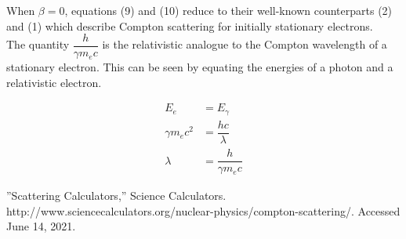 \documentclass{article}
\begin{document}
\noindent When $\beta = 0$, equations (9) and (10) reduce to their well-known counterparts (2) and (1) which describe Compton scattering for initially stationary electrons. \\

\noindent The quantity $\dfrac{h}{\gamma m_ec}$ is the relativistic analogue to the Compton wavelength of a stationary electron. This can be seen by equating the energies of a photon and a relativistic electron.

\begin{align*}
E_e &= E_\gamma \\
\gamma m_ec^2 &= \dfrac{hc}{\lambda} \\
\lambda &= \dfrac{h}{\gamma m_ec}
\end{align*}

\begin{thebibliography}{10}

''Scattering Calculators,'' Science Calculators. \\
http://www.sciencecalculators.org/nuclear-physics/compton-scattering/. Accessed June 14, 2021.

\end{thebibliography}
\end{document}
